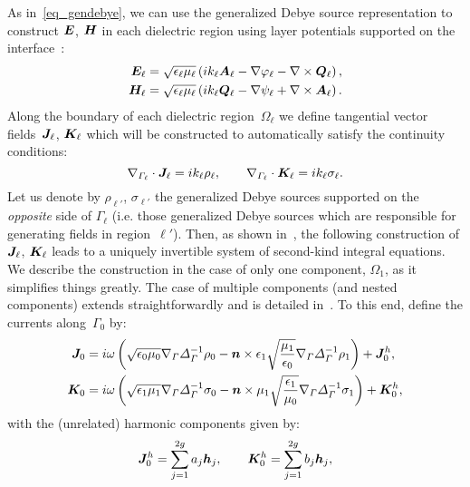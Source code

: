 \documentclass[11pt]{article}
\newcommand{\vct}{\vectorsym}
\newcommand{\surfdivl}{\nabla_{\Gamma_\ell} \cdot}
\newcommand{\surfgrad}{\nabla_\Gamma}
\newcommand{\surflap}{\Delta_\Gamma}
\newcommand{\bn}{\vct{ n}}
\newcommand{\bE}{\vectorsym{E}}
\newcommand{\bH}{\vct{ H}}
\newcommand{\bJ}{\vct{ J}}
\newcommand{\bK}{\vct{ K}}
\newcommand\bQ{\vct{ Q}}
\newcommand\bA{\vct{A}}
\newcommand\bh{\vct{h}}
\numberwithin{equation}{section}
\begin{document}
As in~\eqref{eq_gendebye}, we can use the generalized Debye source
representation to construct $\bE$, $\bH$ in each dielectric region
using layer potentials supported on the interface~\cite{EpGrOn}:
\begin{equation}
  \begin{aligned}
    \bE_\ell &= \sqrt{\epsilon_\ell \mu_\ell}
    \left( ik_\ell \bA_\ell - \nabla \varphi_\ell - \nabla \times
      \bQ_\ell \right), \\
    \bH_\ell &= \sqrt{\epsilon_\ell \mu_\ell}
    \left( ik_\ell \bQ_\ell - \nabla \psi_\ell + \nabla \times
      \bA_\ell \right).
  \end{aligned}
\end{equation}
Along the boundary of each dielectric region~$\Omega_\ell$ we define
tangential vector fields~$\bJ_\ell$, $\bK_\ell$ which will be
constructed to automatically satisfy the continuity conditions:
\begin{equation}
  \surfdivl \bJ_\ell = i k_\ell \rho_\ell,  \qquad
  \surfdivl \bK_\ell = i k_\ell \sigma_\ell.
\end{equation}
Let us denote by $\rho_{\ell'}$, $\sigma_{\ell'}$ the generalized
Debye sources supported on the \emph{opposite} side of
$\Gamma_\ell$ (i.e. those generalized Debye sources which are
responsible for generating fields in region~$\ell'$).
Then, as shown in~\cite{EpGrOn}, the following
construction of $\bJ_\ell$, $\bK_\ell$ leads to a uniquely invertible
system of second-kind integral equations. We describe the construction
in the case of only one component, $\Omega_1$, as it simplifies things
greatly. The case of multiple components (and nested components)
extends straightforwardly and is detailed in~\cite{EpGrOn}.
To this end, define the currents along~$\Gamma_0$ by:
\begin{equation}
  \begin{aligned}
    \bJ_0 &= i\omega \left( \sqrt{\epsilon_0 \mu_0}
      \surfgrad \surflap^{-1} \rho_0 - \bn \times \epsilon_1 \sqrt{\frac{\mu_1}
        {\epsilon_0}} \surfgrad\surflap^{-1} \rho_1 \right) + \bJ_0^h, \\
    \bK_0 &= i\omega \left( \sqrt{\epsilon_1 \mu_1}
      \surfgrad \surflap^{-1} \sigma_0 - \bn \times \mu_1
      \sqrt{\frac{\epsilon_1}
       {\mu_0}} \surfgrad\surflap^{-1} \sigma_1 \right) + \bK_0^h, 
  \end{aligned}
\end{equation}
with the (unrelated) harmonic components given by:
\begin{equation}
\bJ_0^h =  \sum_{j=1}^{2g} a_j \bh_j, \qquad
\bK_0^h =  \sum_{j=1}^{2g} b_j \bh_j,
\end{equation}
\end{document}
